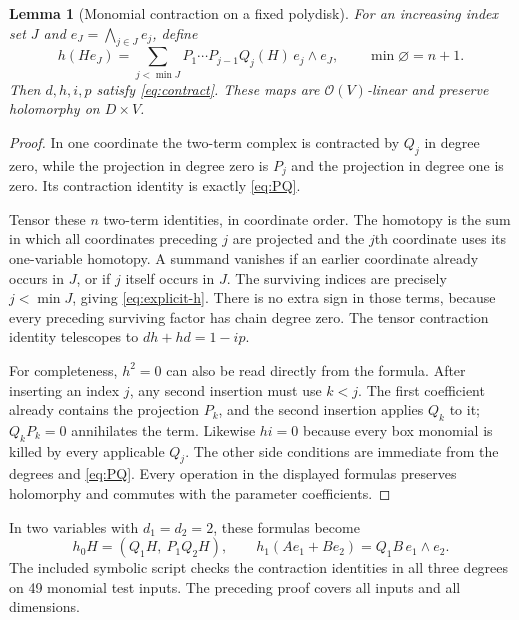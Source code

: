 \documentclass[11pt,letterpaper]{article}
\newtheorem{lemma}[lemma]{Lemma}
\theoremstyle{definition}
\theoremstyle{remark}
\newcommand{\OO}{\mathcal O}
\numberwithin{equation}{section}
\begin{document}
\begin{lemma}[Monomial contraction on a fixed polydisk]\label{lem:polycontract}
For an increasing index set $J$ and $e_J=\bigwedge_{j\in J}e_j$, define
\begin{equation}\label{eq:explicit-h}
 h(H e_J)=\sum_{j<\min J}
 P_1\cdots P_{j-1}Q_j(H)\,e_j\wedge e_J,
 \qquad \min\varnothing=n+1.
\end{equation}
Then $d,h,i,p$ satisfy \eqref{eq:contract}. These maps are $\OO(V)$-linear and preserve holomorphy on $D\times V$.
\end{lemma}
\begin{proof}
In one coordinate the two-term complex is contracted by $Q_j$ in degree zero, while the projection in degree zero is $P_j$ and the projection in degree one is zero. Its contraction identity is exactly \eqref{eq:PQ}.

Tensor these $n$ two-term identities, in coordinate order. The homotopy is the sum in which all coordinates preceding $j$ are projected and the $j$th coordinate uses its one-variable homotopy. A summand vanishes if an earlier coordinate already occurs in $J$, or if $j$ itself occurs in $J$. The surviving indices are precisely $j<\min J$, giving \eqref{eq:explicit-h}. There is no extra sign in those terms, because every preceding surviving factor has chain degree zero. The tensor contraction identity telescopes to $dh+hd=1-ip$.

For completeness, $h^2=0$ can also be read directly from the formula. After inserting an index $j$, any second insertion must use $k<j$. The first coefficient already contains the projection $P_k$, and the second insertion applies $Q_k$ to it; $Q_kP_k=0$ annihilates the term. Likewise $hi=0$ because every box monomial is killed by every applicable $Q_j$. The other side conditions are immediate from the degrees and \eqref{eq:PQ}. Every operation in the displayed formulas preserves holomorphy and commutes with the parameter coefficients.
\end{proof}
In two variables with $d_1=d_2=2$, these formulas become
\[
 h_0H=(Q_1H,\ P_1Q_2H),\qquad
 h_1(Ae_1+Be_2)=Q_1B\,e_1\wedge e_2.
\]
The included symbolic script checks the contraction identities in all three degrees on 49 monomial test inputs. The preceding proof covers all inputs and all dimensions.
\end{document}
